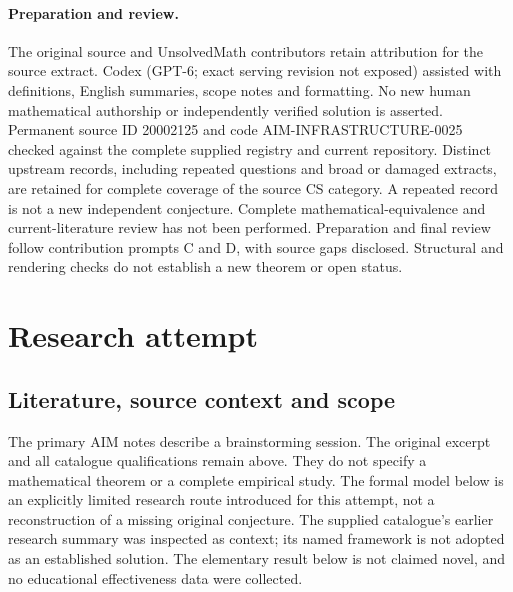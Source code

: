 \documentclass[11pt]{article}
\begin{document}
\paragraph{Preparation and review.}
The original source and UnsolvedMath contributors retain attribution for the source extract. Codex (GPT-6; exact serving revision not exposed) assisted with definitions, English summaries, scope notes and formatting. No new human mathematical authorship or independently verified solution is asserted. Permanent source ID 20002125 and code AIM-INFRASTRUCTURE-0025 checked against the complete supplied registry and current repository. Distinct upstream records, including repeated questions and broad or damaged extracts, are retained for complete coverage of the source CS category. A repeated record is not a new independent conjecture. Complete mathematical-equivalence and current-literature review has not been performed. Preparation and final review follow contribution prompts C and D, with source gaps disclosed. Structural and rendering checks do not establish a new theorem or open status.
\label{end:20002125}

\section{Research attempt}
\subsection{Literature, source context and scope}
The primary AIM notes describe a brainstorming session. The original excerpt and all catalogue qualifications remain above. They do not specify a mathematical theorem or a complete empirical study. The formal model below is an explicitly limited research route introduced for this attempt, not a reconstruction of a missing original conjecture. The supplied catalogue's earlier research summary was inspected as context; its named framework is not adopted as an established solution. The elementary result below is not claimed novel, and no educational effectiveness data were collected.
\end{document}
